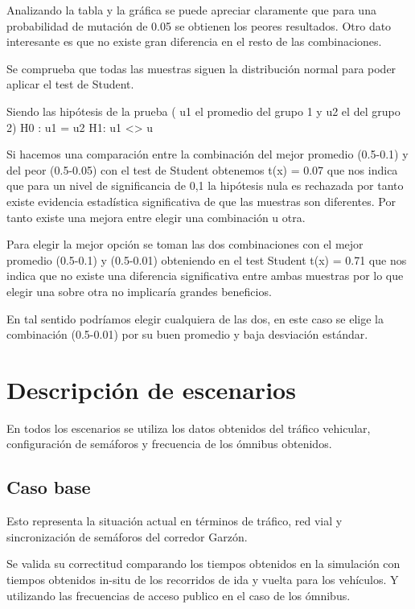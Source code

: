 Analizando la tabla y la gráfica se puede apreciar claramente que para una probabilidad de mutación de 0.05 se obtienen los peores resultados. Otro dato interesante es que no existe gran diferencia en el resto de las combinaciones.

Se comprueba que todas las muestras siguen la distribución normal  para poder aplicar el test de Student.

Siendo las hipótesis de la prueba ( u1 el promedio del 
grupo 1 y u2 el del grupo 2)
H0 : u1 = u2  
H1: u1 <> u

Si hacemos una comparación entre la combinación del mejor promedio (0.5-0.1) y del peor (0.5-0.05) con el test de Student obtenemos t(x) = 0.07 que nos indica que para un nivel de significancia de  0,1 la hipótesis nula es rechazada por tanto existe evidencia estadística significativa de que las muestras son diferentes. Por tanto existe una mejora entre elegir una combinación u otra. 


Para elegir la mejor opción  se toman las dos combinaciones con el mejor promedio (0.5-0.1) y (0.5-0.01) obteniendo en el test Student t(x) = 0.71 que nos indica que no existe una diferencia significativa entre ambas muestras por lo que elegir una sobre otra no implicaría grandes beneficios.

En tal sentido podríamos elegir cualquiera de las dos, en este caso se elige  la combinación (0.5-0.01) por su buen promedio y baja desviación estándar.

  





\section{Descripción de escenarios}
En todos los escenarios se utiliza los datos obtenidos del tráfico vehicular, configuración de semáforos y frecuencia de los ómnibus obtenidos. 

\subsection{Caso base}
Esto representa la situación actual en términos de tráfico, red vial y sincronización de semáforos del corredor Garzón. 

Se valida su correctitud comparando los tiempos obtenidos en la simulación con tiempos obtenidos in-situ de los recorridos de ida y vuelta para los vehículos. Y utilizando las frecuencias de acceso publico en el caso de los ómnibus.

